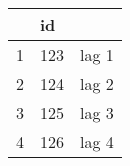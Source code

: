 \begin{table}[ht] 
\centering 
\begin{tabular}{lll}
\toprule
 & id & \\
\midrule
1 & 123 & lag 1  \\
2 & 124 & lag 2  \\
3 & 125 &  lag 3  \\
4 & 126 & lag 4 \\
\bottomrule
\end{tabular}  
\end{table} 